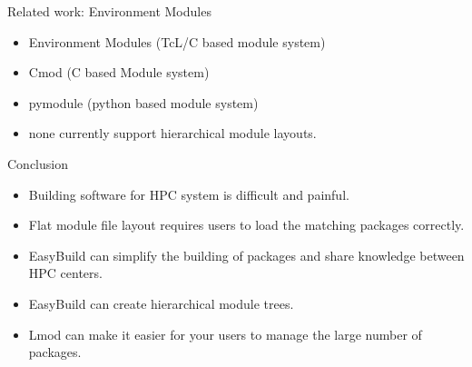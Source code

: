 \documentclass[10pt,xcolor={usenames,dvipsnames}]{beamer}
\begin{document}
\begin{frame}{Related work: Environment Modules}
\begin{itemize}
    \item Environment Modules (TcL/C based module system)
    \item Cmod (C based Module system)
    \item pymodule (python based module system)
    \item none currently support hierarchical module layouts.
\end{itemize}
\end{frame}


\begin{frame}{Conclusion}
\begin{itemize}
    \item
        Building software for HPC system is difficult and painful.
    \item
        Flat module file layout requires users to load the matching
        packages correctly.
    \item
        EasyBuild can simplify the building of packages and share
        knowledge between HPC centers.
    \item
        EasyBuild can create hierarchical module trees.
    \item
        Lmod can make it easier for your users to manage the large
        number of packages.
\end{itemize}
\end{frame}
\end{document}
